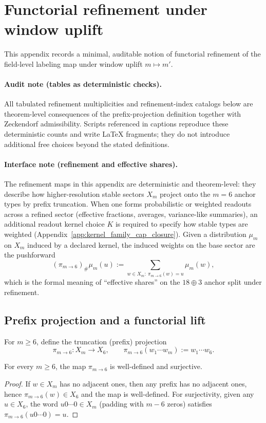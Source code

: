 \section{Functorial refinement under window uplift}
\label{app:functorial_refinement}

This appendix records a minimal, auditable notion of functorial refinement of the field-level labeling map under window uplift $m\mapsto m'$.
\paragraph{Audit note (tables as deterministic checks).}
All tabulated refinement multiplicities and refinement-index catalogs below are theorem-level consequences of the prefix-projection definition together with Zeckendorf admissibility.
Scripts referenced in captions reproduce these deterministic counts and write \LaTeX{} fragments; they do not introduce additional free choices beyond the stated definitions.

\paragraph{Interface note (refinement and effective shares).}
\InterfaceTag The refinement maps in this appendix are deterministic and theorem-level: they describe how higher-resolution stable sectors $X_m$ project onto the $m=6$ anchor types by prefix truncation.
When one forms probabilistic or weighted readouts across a refined sector (effective fractions, averages, variance-like summaries), an additional readout kernel choice $K$ is required to specify how stable types are weighted (Appendix~\ref{app:kernel_family_cap_closure}).
Given a distribution $\mu_m$ on $X_m$ induced by a declared kernel, the induced weights on the base sector are the pushforward
\[
(\pi_{m\to 6})_\#\mu_m(u):=\sum_{w\in X_m:\ \pi_{m\to 6}(w)=u}\mu_m(w),
\]
which is the formal meaning of ``effective shares'' on the $18\oplus 3$ anchor split under refinement.

\subsection{Prefix projection and a functorial lift}

For $m\ge 6$, define the truncation (prefix) projection
\[
\pi_{m\to 6}:X_m\to X_6,\qquad
\pi_{m\to 6}(w_1\cdots w_m):=w_1\cdots w_6.
\]

\begin{lemma}\label{lem:pi_m6_surj}
For every $m\ge 6$, the map $\pi_{m\to 6}$ is well-defined and surjective.
\end{lemma}
\begin{proof}
If $w\in X_m$ has no adjacent ones, then any prefix has no adjacent ones, hence $\pi_{m\to 6}(w)\in X_6$ and the map is well-defined.
For surjectivity, given any $u\in X_6$, the word $u0\cdots 0\in X_m$ (padding with $m-6$ zeros) satisfies $\pi_{m\to 6}(u0\cdots 0)=u$.
\end{proof}


